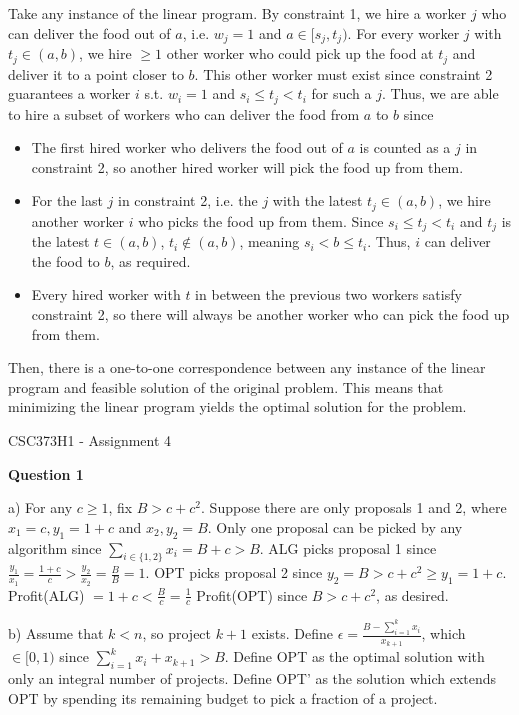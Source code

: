 \documentclass[11pt]{article}
\begin{document}
Take any instance of the linear program. By constraint 1, we hire a worker $j$ who can deliver the food out of $a$, i.e. $w_j=1$ and $a\in [s_j,t_j)$. For every worker $j$ with $t_j\in (a,b)$, we hire $\geq 1$ other worker who could pick up the food at $t_j$ and deliver it to a point closer to $b$. This other worker must exist since constraint 2 guarantees a worker $i$ s.t. $w_i=1$ and $s_i\leq t_j<t_i$ for such a $j$. Thus, we are able to hire a subset of workers who can deliver the food from $a$ to $b$ since

\begin{itemize}
    \item The first hired worker who delivers the food out of $a$ is counted as a $j$ in constraint 2, so another hired worker will pick the food up from them.
    \item For the last $j$ in constraint 2, i.e. the $j$ with the latest $t_j\in (a,b)$, we hire another worker $i$ who picks the food up from them. Since $s_i\leq t_j<t_i$ and $t_j$ is the latest $t\in (a,b)$, $t_i\notin (a,b)$, meaning $s_i<b\leq t_i$. Thus, $i$ can deliver the food to $b$, as required.
    \item Every hired worker with $t$ in between the previous two workers satisfy constraint 2, so there will always be another worker who can pick the food up from them.
\end{itemize}

Then, there is a one-to-one correspondence between any instance of the linear program and feasible solution of the original problem. This means that minimizing the linear program yields the optimal solution for the problem.\\

\begin{center}
{\Large CSC373H1 - Assignment 4}
\end{center}

\textbf{Question 1}

a) For any $c\geq 1$, fix $B>c+c^2$. Suppose there are only proposals 1 and 2, where $x_1=c,y_1=1+c$ and $x_2,y_2=B$. Only one proposal can be picked by any algorithm since $\sum_{i\in\{1,2\}} x_i=B+c>B$. ALG picks proposal 1 since $\frac{y_1}{x_1}=\frac{1+c}{c}>\frac{y_2}{x_2}=\frac{B}{B}=1$. OPT picks proposal 2 since $y_2=B>c+c^2\geq y_1=1+c$. Profit(ALG) $=1+c<\frac{B}{c}=\frac{1}{c}$ Profit(OPT) since $B>c+c^2$, as desired.

b) Assume that $k<n$, so project $k+1$ exists. Define $\epsilon=\frac{B-\sum_{i=1}^k x_i}{x_{k+1}}$, which $\in[0,1)$ since $\sum_{i=1}^k x_i+x_{k+1}>B$. Define OPT as the optimal solution with only an integral number of projects. Define OPT' as the solution which extends OPT by spending its remaining budget to pick a fraction of a project.
\end{document}
